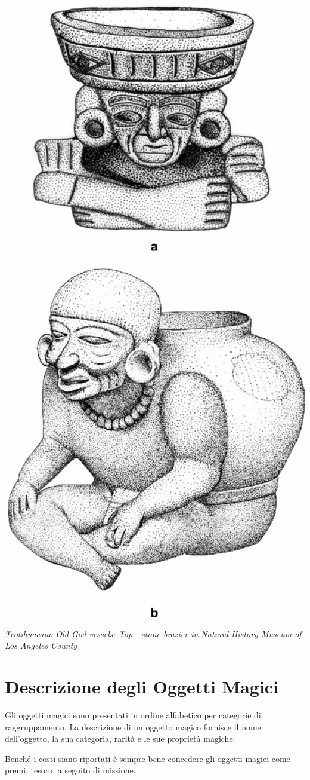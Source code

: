 \begin{multicols}{2}
\begin{center}
\includegraphics[width=0.6\linewidth]{immagini/ancientbraziers2.png}

\textit{Teotihuacano Old God vessels: Top - stone brazier in Natural History Museum of Los Angeles County}
\end{center}




\pagebreak

\section{Descrizione degli Oggetti Magici}


Gli oggetti magici sono presentati in ordine alfabetico per categorie di raggruppamento. La descrizione di un oggetto magico fornisce il nome dell'oggetto, la sua categoria, rarità e le sue proprietà magiche.

Benché i costi siano riportati è sempre bene concedere gli oggetti magici come premi, tesoro, a seguito di missione.


\end{multicols}
